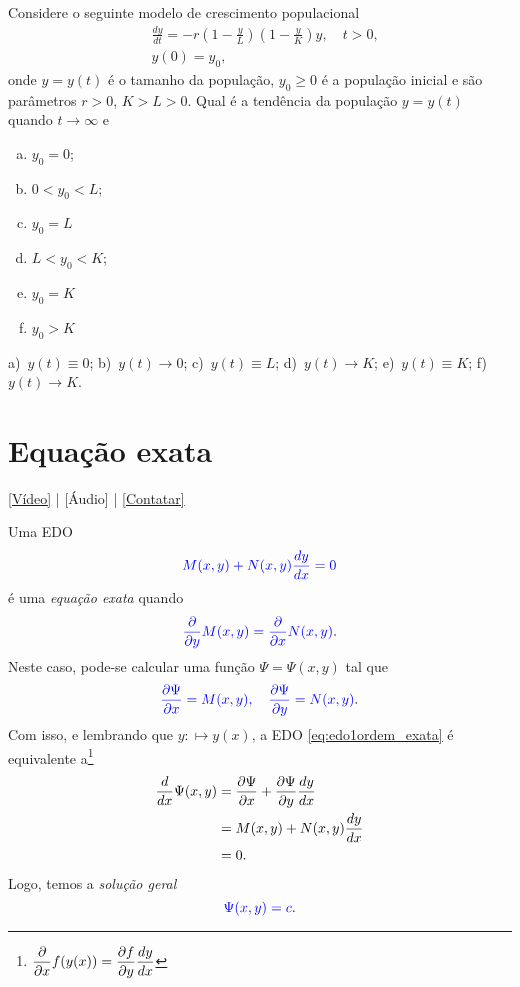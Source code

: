 \begin{exer}
  Considere o seguinte modelo de crescimento populacional
  \begin{align*}
    &\frac{dy}{dt} = -r\left(1 - \frac{y}{L}\right)\left(1 - \frac{y}{K}\right)y,\quad t>0,\\
    &y(0) = y_0,
  \end{align*}
  onde $y = y(t)$ é o tamanho da população, $y_0 \geq 0$ é a população inicial e são parâmetros $r > 0$, $K>L>0$. Qual é a tendência da população $y = y(t)$ quando $t\to\infty$ e
  \begin{enumerate}[a)]
  \item $y_0 = 0$;
  \item $0 < y_0 < L$;
  \item $y_0 = L$
  \item $L < y_0 < K$;
  \item $y_0 = K$
  \item $y_0 > K$
  \end{enumerate}
\end{exer}
\begin{resp}
  a)~$y(t) \equiv 0$; b)~$y(t)\to 0$; c)~$y(t)\equiv L$; d)~$y(t)\to K$; e)~$y(t)\equiv K$; f)~$y(t)\to K$.
\end{resp}

\section{Equação exata}\label{cap_edo1ordem_sec_eqexata}

\begin{flushright}
  \href{https://archive.org/details/edo-ordem-1-exata}{[Vídeo]} | [Áudio] | \href{https://phkonzen.github.io/notas/contato.html}{[Contatar]}
\end{flushright}

Uma EDO
\begin{equation}\label{eq:edo1ordem_exata}
  {\color{blue} M(x,y) + N(x,y)\frac{dy}{dx} = 0}
\end{equation}
é uma \emph{equação exata} quando
\begin{equation}
  {\color{blue} \frac{\partial}{\partial y}M(x,y) = \frac{\partial}{\partial x}N(x,y)}.
\end{equation}
Neste caso, pode-se calcular uma função $\Psi = \Psi(x,y)$ tal que
\begin{equation}
  {\color{blue}\frac{\partial\Psi}{\partial x} = M(x,y),\quad\frac{\partial\Psi}{\partial y} = N(x,y)}.
\end{equation}
Com isso, e lembrando que $y:\mapsto y(x)$, a EDO \eqref{eq:edo1ordem_exata} é equivalente a\footnote{$\displaystyle \frac{\partial}{\partial x}f(y(x)) = \frac{\partial f}{\partial y}\frac{d y}{dx}$}
\begin{align}
  \frac{d}{dx}\Psi(x,y) &= \frac{\partial\Psi}{\partial x} + \frac{\partial\Psi}{\partial y}\frac{dy}{dx} \\
  &= M(x,y) + N(x,y)\frac{dy}{dx} \\
  &= 0.
\end{align}
Logo, temos a \emph{solução geral}
\begin{equation}
  {\color{blue}\Psi(x,y) = c}.
\end{equation}

